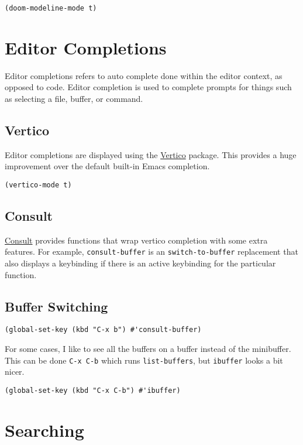 \documentclass[11pt]{article}
\begin{document}
\begin{verbatim}
(doom-modeline-mode t)
\end{verbatim}
\section{Editor Completions}
\label{sec:org99ebd46}

Editor completions refers to auto complete done within the editor context, as
opposed to code. Editor completion is used to complete prompts for things such
as selecting a file, buffer, or command.
\subsection{Vertico}
\label{sec:org0800f06}

Editor completions are displayed using the \href{https://github.com/minad/vertico}{Vertico} package. This provides a huge
improvement over the default built-in Emacs completion.

\begin{verbatim}
(vertico-mode t)
\end{verbatim}
\subsection{Consult}
\label{sec:org6a4a954}

\href{https://github.com/minad/consult}{Consult} provides functions that wrap vertico completion with some extra
features. For example, \texttt{consult-buffer} is an \texttt{switch-to-buffer} replacement
that also displays a keybinding if there is an active keybinding for the
particular function.
\subsection{Buffer Switching}
\label{sec:orgd93ea28}

\begin{verbatim}
(global-set-key (kbd "C-x b") #'consult-buffer)
\end{verbatim}

For some cases, I like to see all the buffers on a buffer instead of the
minibuffer. This can be done \texttt{C-x C-b} which runs \texttt{list-buffers}, but \texttt{ibuffer}
looks a bit nicer.

\begin{verbatim}
(global-set-key (kbd "C-x C-b") #'ibuffer)
\end{verbatim}
\section{Searching}
\label{sec:org28453a2}
\end{document}
